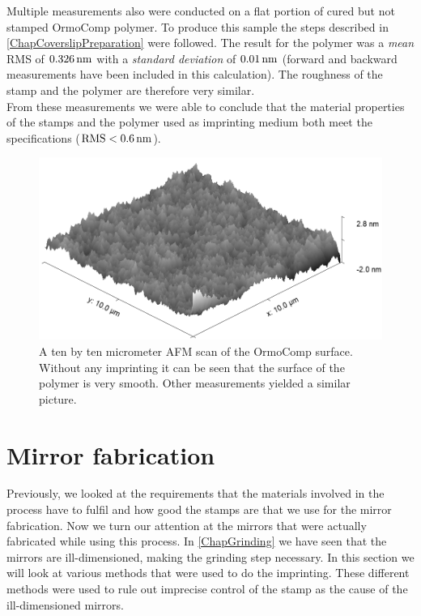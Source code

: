 Multiple measurements also were conducted on a flat portion of cured but not stamped OrmoComp polymer. To produce this sample the steps described in \autoref{ChapCoverslipPreparation} were followed. The result for the polymer was a \textit{mean} RMS of $0.326\nm$ with a \textit{standard deviation} of $0.01\nm$ (forward and backward measurements have been included in this calculation). The roughness of the stamp and the polymer are therefore very similar.\\
From these measurements we were able to conclude that the material properties of the stamps and the polymer used as imprinting medium both meet the specifications ($\si{RMS}<0.6\nm$). 

\begin{figure}[H]
	\includegraphics[scale=0.5]{source/OrmoComp_rms}
	\caption{A ten by ten micrometer AFM scan of the OrmoComp surface. Without any imprinting it can be seen that the surface of the polymer is very smooth. Other measurements yielded a similar picture.}
\end{figure}

\section{Mirror fabrication}\label{ChapMirrorFab}
Previously, we looked at the requirements that the materials involved in the process have to fulfil and how good the stamps are that we use for the mirror fabrication. Now we turn our attention at the mirrors that were actually fabricated while using this process. In \autoref{ChapGrinding} we have seen that the mirrors are ill-dimensioned, making the grinding step necessary. In this section we will look at various methods that were used to do the imprinting. These different methods were used to rule out imprecise control of the stamp as the cause of the ill-dimensioned mirrors.

